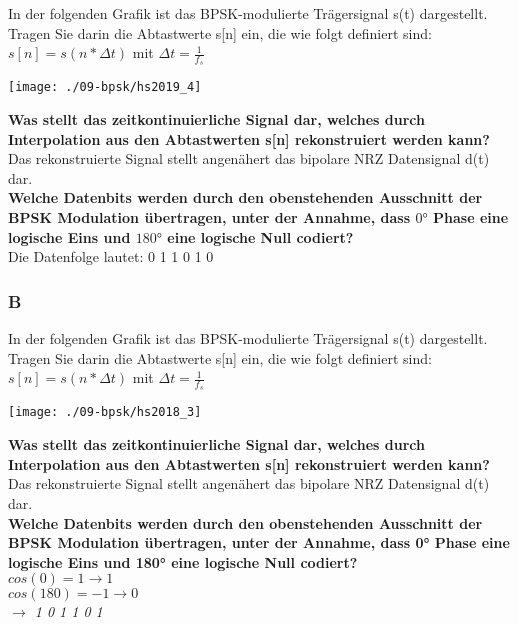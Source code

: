 In der folgenden Grafik ist das BPSK-modulierte Trägersignal s(t) dargestellt. Tragen Sie darin die Abtastwerte s[n] ein, die wie folgt definiert sind:\\
$s[n]=s(n*\Delta t)$ mit $\Delta t = \frac{1}{f_s}$
\begin{center}
    \vspace{-8pt}
    \texttt{[image: ./09-bpsk/hs2019\_4]}
    \vspace{-8pt}
\end{center}

\textbf{Was stellt das zeitkontinuierliche Signal dar, welches durch Interpolation aus den Abtastwerten s[n] rekonstruiert werden kann?}\\
Das rekonstruierte Signal stellt angenähert das bipolare NRZ Datensignal d(t) dar.\\

\textbf{Welche Datenbits werden durch den obenstehenden Ausschnitt der BPSK Modulation übertragen, unter der Annahme, dass $0°$ Phase eine logische Eins und $180°$ eine logische
Null codiert?}\\
Die Datenfolge lautet: 0 1 1 0 1 0

\subsubsection{B}

In der folgenden Grafik ist das BPSK-modulierte Trägersignal s(t) dargestellt. Tragen Sie darin die Abtastwerte s[n] ein, die wie folgt definiert sind:\\
$s[n]=s(n*\Delta t)$ mit $\Delta t=\frac{1}{f_s}$
\begin{center}
    \vspace{-8pt}
    \texttt{[image: ./09-bpsk/hs2018\_3]}
    \vspace{-8pt}
\end{center}

\textbf{Was stellt das zeitkontinuierliche Signal dar, welches durch Interpolation aus den Abtastwerten s[n] rekonstruiert werden kann?}\\
Das rekonstruierte Signal stellt angenähert das bipolare NRZ Datensignal d(t) dar.\\

\textbf{Welche Datenbits werden durch den obenstehenden Ausschnitt der BPSK Modulation übertragen, unter der Annahme, dass 0° Phase eine logische Eins und 180° eine logische
Null codiert?}\\
$cos(0)=1 \rightarrow 1$\\
$cos(180)=-1 \rightarrow 0$\\
\textit{$\rightarrow$ 1 0 1 1 0 1}


